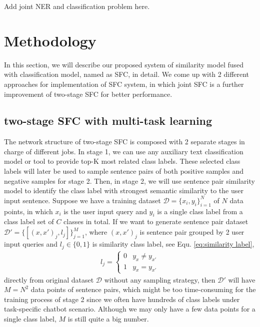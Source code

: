 \documentclass[letterpaper]{article} %
\begin{document}
  {Add joint NER and classification problem here.}


  \section{Methodology}
  In  this  section,  we  will  describe our proposed system of similarity model fused with
  classification  model,  named  as  SFC, in detail. We come up with 2 different
  approaches  for  implementation  of SFC system, in which joint SFC is a
  further improvement of two-stage SFC for better performance.

  \subsection{two-stage SFC with multi-task learning}

  The network   structure   of   two-stage   SFC  is  composed  with  2  separate  stages  in  charge of
  different  jobs. In stage 1, we can use any auxiliary text classification model or tool to provide
  top-K  most  related class labels. These selected class labels will later be used to sample sentence pairs of both positive
  samples  and negative samples for stage 2. Then, in stage 2, we will use sentence pair similarity model to identify the class label with strongest semantic similarity to the user input sentence. Suppose we have a training dataset
  $\mathcal{D}=\{x_{i},y_{i}\}_{i=1}^{N}$  of  $N$ data points, in which $x_{i}$
  is the user input query and $y_{i}$ is a single class label from a class label
  set  of  $C$  classes  in total. If we want to generate sentence pair dataset
  $\mathcal{D'}=\{[(x,x')_{j},l_{j}]\}_{j=1}^{M}$,   where   $(x,   x')_{j}$  is
  sentence  pair  grouped  by  2  user  input  queries and $l_{j}\in\{0, 1\}$ is
  similarity class label, see Equ. \ref{eq:similarity label},
  \begin{align}
    l_{j}=
    \begin{cases} \label{eq:similarity label}
      0 & y_{x}\neq y_{x'}\\
      1 & y_{x}=y_{x'}
    \end{cases}
  \end{align}
  directly  from  original dataset $\mathcal{D}$ without any sampling strategy,
  then  $\mathcal{D'}$  will  have  $M=N^2$ data points of sentence pairs, which
  might be too time-consuming for the training process of stage 2 since we often
  have  hundreds  of class labels under task-specific chatbot scenario. Although
  we  may  only  have  a  few data points for a single class label, $M$ is still
  quite a big number.
\end{document}

